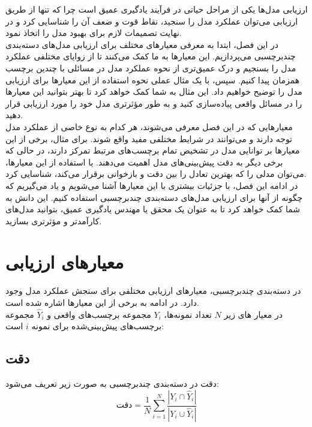 
ارزیابی مدل‌ها یکی از مراحل حیاتی در فرآیند یادگیری عمیق است چرا که تنها از طریق ارزیابی می‌توان عملکرد مدل را سنجید، نقاط قوت و ضعف آن را شناسایی کرد و در نهایت تصمیمات لازم برای بهبود مدل را اتخاذ نمود.
\\
در این فصل، ابتدا به معرفی معیارهای مختلف برای ارزیابی مدل‌های دسته‌بندی چندبرچسبی می‌پردازیم. این معیارها به ما کمک می‌کنند تا از زوایای مختلفی عملکرد مدل را بسنجیم و درک عمیق‌تری از نحوه عملکرد مدل در مسائلی با چندین برچسب همزمان پیدا کنیم. سپس، با یک مثال عملی نحوه استفاده از این معیارها برای ارزیابی مدل را توضیح خواهیم داد. این مثال به شما کمک خواهد کرد تا بهتر بتوانید این معیارها را در مسائل واقعی پیاده‌سازی کنید و به طور مؤثرتری مدل خود را مورد ارزیابی قرار دهید.
\\
معیارهایی که در این فصل معرفی می‌شوند، هر کدام به نوع خاصی از عملکرد مدل توجه دارند و می‌توانند در شرایط مختلفی مفید واقع شوند. برای مثال، برخی از این معیارها بر توانایی مدل در تشخیص تمام برچسب‌های مرتبط تمرکز دارند، در حالی که برخی دیگر به دقت پیش‌بینی‌های مدل اهمیت می‌دهند. با استفاده از این معیارها، می‌توان مدلی را که بهترین تعادل را بین دقت و بازخوانی برقرار می‌کند، شناسایی کرد.
\\
در ادامه این فصل، با جزئیات بیشتری با این معیارها آشنا می‌شویم و یاد می‌گیریم که چگونه از آنها برای ارزیابی مدل‌های دسته‌بندی چندبرچسبی استفاده کنیم. این دانش به شما کمک خواهد کرد تا به عنوان یک محقق یا مهندس یادگیری عمیق، بتوانید مدل‌های کارآمدتر و مؤثرتری بسازید.
\section{معیارهای ارزیابی}

در دسته‌بندی چندبرچسبی، معیارهای ارزیابی مختلفی برای سنجش عملکرد مدل وجود دارد. در ادامه به برخی از این معیارها اشاره شده است.
\\
در معیار های زیر $N$ تعداد نمونه‌ها، $Y_i$ مجموعه برچسب‌های واقعی و $\hat{Y}_i$ مجموعه برچسب‌های پیش‌بینی‌شده برای نمونه $i$ است:


\subsection{دقت}

دقت در دسته‌بندی چندبرچسبی به صورت زیر تعریف می‌شود:
\cite{evaluationMetric}
\begin{equation}
	\text{دقت} = \frac{1}{N} \sum_{i=1}^{N} \frac{|Y_i \cap \hat{Y}_i|}{|Y_i \cup \hat{Y}_i|}
	\label{eq:accuracy}
\end{equation}
